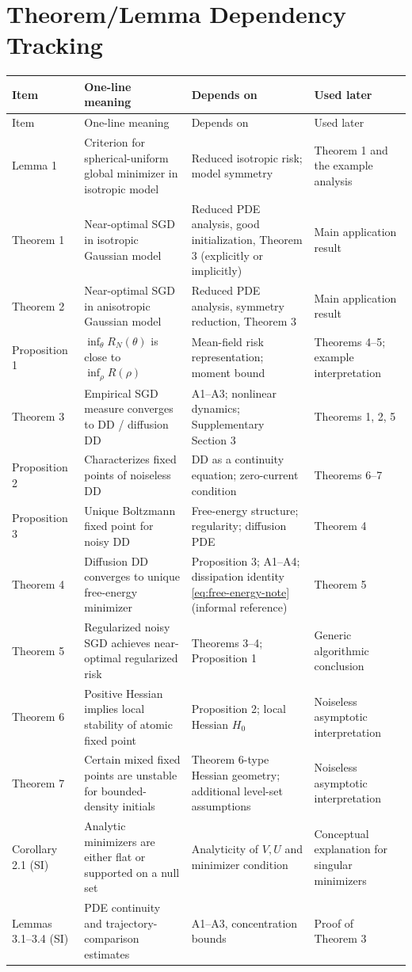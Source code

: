 \section{Theorem/Lemma Dependency Tracking}

\begin{longtable}{>{\raggedright\arraybackslash}p{2.2cm} >{\raggedright\arraybackslash}p{4.0cm} >{\raggedright\arraybackslash}p{4.2cm} >{\raggedright\arraybackslash}p{4.2cm}}
\toprule
Item & One-line meaning & Depends on & Used later \\
\midrule
\endfirsthead
\toprule
Item & One-line meaning & Depends on & Used later \\
\midrule
\endhead
Lemma 1 & Criterion for spherical-uniform global minimizer in isotropic model & Reduced isotropic risk; model symmetry & Theorem 1 and the example analysis \\
Theorem 1 & Near-optimal SGD in isotropic Gaussian model & Reduced PDE analysis, good initialization, Theorem 3 (explicitly or implicitly) & Main application result \\
Theorem 2 & Near-optimal SGD in anisotropic Gaussian model & Reduced PDE analysis, symmetry reduction, Theorem 3 & Main application result \\
Proposition 1 & $\inf_\theta R_N(\theta)$ is close to $\inf_\rho R(\rho)$ & Mean-field risk representation; moment bound & Theorems 4--5; example interpretation \\
Theorem 3 & Empirical SGD measure converges to DD / diffusion DD & A1--A3; nonlinear dynamics; Supplementary Section 3 & Theorems 1, 2, 5 \\
Proposition 2 & Characterizes fixed points of noiseless DD & DD as a continuity equation; zero-current condition & Theorems 6--7 \\
Proposition 3 & Unique Boltzmann fixed point for noisy DD & Free-energy structure; regularity; diffusion PDE & Theorem 4 \\
Theorem 4 & Diffusion DD converges to unique free-energy minimizer & Proposition 3; A1--A4; dissipation identity \eqref{eq:free-energy-note} (informal reference) & Theorem 5 \\
Theorem 5 & Regularized noisy SGD achieves near-optimal regularized risk & Theorems 3--4; Proposition 1 & Generic algorithmic conclusion \\
Theorem 6 & Positive Hessian implies local stability of atomic fixed point & Proposition 2; local Hessian $H_0$ & Noiseless asymptotic interpretation \\
Theorem 7 & Certain mixed fixed points are unstable for bounded-density initials & Theorem 6-type Hessian geometry; additional level-set assumptions & Noiseless asymptotic interpretation \\
Corollary 2.1 (SI) & Analytic minimizers are either flat or supported on a null set & Analyticity of $V,U$ and minimizer condition & Conceptual explanation for singular minimizers \\
Lemmas 3.1--3.4 (SI) & PDE continuity and trajectory-comparison estimates & A1--A3, concentration bounds & Proof of Theorem 3 \\
\bottomrule
\end{longtable}

